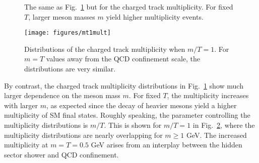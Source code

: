 \documentclass[letterpaper,11pt]{article}
\DeclareRobustCommand{\Fig}[1]{Fig.~\ref{#1}}
\begin{document}
 
\begin{figure}[t]
\centering
{}
     \hfill
{}
          \hfill
     \hfill
     \hfill
\caption{
The same as \Fig{fig:appsuepNoT_mult} but for the charged track multiplicity.
%
For fixed $T$, larger meson masses $m$ yield higher multiplicity events.}
%
\label{fig:appsuepNoT_mult}
\end{figure} 


\begin{figure}[t]
\centering
\texttt{[image: figures/mt1mult]}
\caption{ Distributions of the charged track multiplicity when $m/T =1$.
%
For $m = T$ values away from the QCD confinement scale, the distributions are very similar.}
\label{fig:mt1}
\end{figure} 

 


By contrast, the charged track multiplicity distributions in \Fig{fig:appsuepNoT_mult} show much larger dependence on the meson mass $m$.
%
For fixed $T$, the multiplicity increases with larger $m$, as expected since the decay of heavier mesons yield a higher multiplicity of SM final states.
%
Roughly speaking, the parameter controlling the multiplicity distributions is $m/T$.
%
This is shown for $m/T = 1$ in \Fig{fig:mt1}, where the multiplicity distributions are nearly overlapping for $m \geq 1$ GeV.
%
The increased multiplicity at $m = T = 0.5$ GeV arises from an interplay between the hidden sector shower and QCD confinement.





\end{document}
